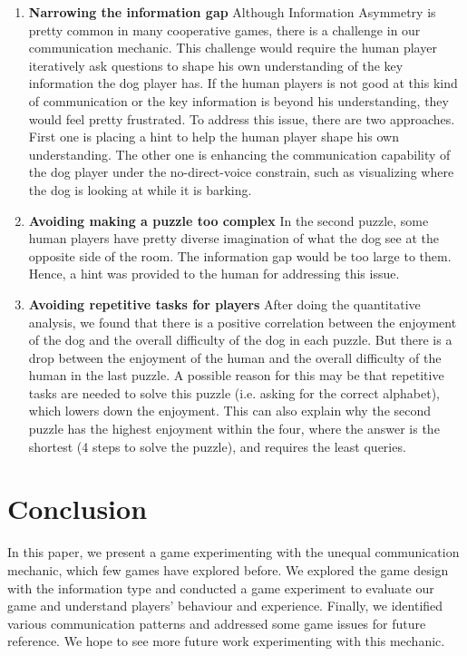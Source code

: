 \documentclass{sigchi}
\begin{document}
\begin{enumerate}
\item \textbf{Narrowing the information gap}\newline
Although Information Asymmetry is pretty common in many cooperative games, there is a challenge in our communication mechanic. This challenge would require the human player iteratively ask questions to shape his own understanding of the key information the dog player has. If the human players is not good at this kind of communication or the key information is beyond his understanding, they would feel pretty frustrated. To address this issue, there are two approaches. First one is placing a hint to help the human player shape his own understanding. The other one is enhancing the communication capability of the dog player under the no-direct-voice constrain, such as visualizing where the dog is looking at while it is barking. 

\item \textbf{Avoiding making a puzzle too complex}\newline
In the second puzzle, some human players have pretty diverse imagination of what the dog see at the opposite side of the room. The information gap would be too large to them. Hence, a hint was provided to the human for addressing this issue.

\item \textbf{Avoiding repetitive tasks for players}\newline
After doing the quantitative analysis, we found that there is a positive correlation between the enjoyment of the dog and the overall difficulty of the dog in each puzzle. But there is a drop between the enjoyment of the human and the overall difficulty of the human in the last puzzle. A possible reason for this may be that repetitive tasks are needed to solve this puzzle (i.e. asking for the correct alphabet), which lowers down the enjoyment. This can also explain why the second puzzle has the highest enjoyment within the four, where the answer is the shortest (4 steps to solve the puzzle), and requires the least queries.

\end{enumerate}

\section{Conclusion}
In this paper, we present a game experimenting with the unequal communication mechanic, which few games have explored before. We explored the game design with the information type and conducted a game experiment to evaluate our game and understand players' behaviour and experience. Finally, we identified various communication patterns and addressed some game issues for future reference. We hope to see more future work experimenting with this mechanic.



\end{document}
